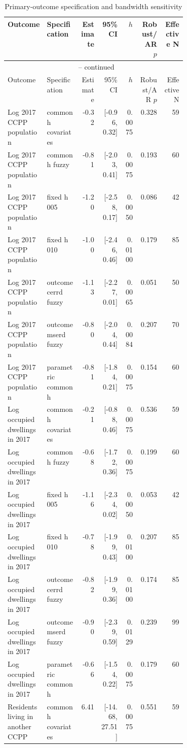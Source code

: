 \begingroup
\scriptsize
\begin{longtable}{p{0.22\linewidth}p{0.19\linewidth}rrrrr}
\caption{Primary-outcome specification and bandwidth sensitivity}
\label{tab:rd_outcomes_robustness_2017_ccpp} \\
\toprule
Outcome & Specification & Estimate & 95\% CI & \(h\) & Robust/AR \(p\) & Effective N \\
\midrule
\endfirsthead
\multicolumn{7}{c}{\tablename\ \thetable{} -- continued} \\
\toprule
Outcome & Specification & Estimate & 95\% CI & \(h\) & Robust/AR \(p\) & Effective N \\
\midrule
\endhead
Log 2017 CCPP population & common h covariates & -0.32 & [-0.96, 0.32] & 0.0075 & 0.328 & 59 \\
Log 2017 CCPP population & common h fuzzy & -0.81 & [-2.03, 0.41] & 0.0075 & 0.193 & 60 \\
Log 2017 CCPP population & fixed h 005 & -1.20 & [-2.58, 0.17] & 0.0050 & 0.086 & 42 \\
Log 2017 CCPP population & fixed h 010 & -1.00 & [-2.46, 0.46] & 0.0100 & 0.179 & 85 \\
Log 2017 CCPP population & outcome cerrd fuzzy & -1.13 & [-2.27, 0.01] & 0.0065 & 0.051 & 50 \\
Log 2017 CCPP population & outcome mserd fuzzy & -0.80 & [-2.04, 0.44] & 0.0084 & 0.207 & 70 \\
Log 2017 CCPP population & parametric common h & -0.81 & [-1.84, 0.21] & 0.0075 & 0.154 & 60 \\
Log occupied dwellings in 2017 & common h covariates & -0.21 & [-0.88, 0.46] & 0.0075 & 0.536 & 59 \\
Log occupied dwellings in 2017 & common h fuzzy & -0.68 & [-1.72, 0.36] & 0.0075 & 0.199 & 60 \\
Log occupied dwellings in 2017 & fixed h 005 & -1.16 & [-2.34, 0.02] & 0.0050 & 0.053 & 42 \\
Log occupied dwellings in 2017 & fixed h 010 & -0.78 & [-1.99, 0.43] & 0.0100 & 0.207 & 85 \\
Log occupied dwellings in 2017 & outcome cerrd fuzzy & -0.82 & [-1.99, 0.36] & 0.0100 & 0.174 & 85 \\
Log occupied dwellings in 2017 & outcome mserd fuzzy & -0.90 & [-2.39, 0.59] & 0.0129 & 0.239 & 99 \\
Log occupied dwellings in 2017 & parametric common h & -0.66 & [-1.54, 0.22] & 0.0075 & 0.179 & 60 \\
Residents living in another CCPP & common h covariates & 6.41 & [-14.68, 27.51] & 0.0075 & 0.551 & 59 \\

\end{longtable}
